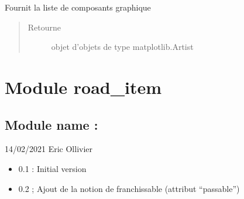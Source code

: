 \documentclass[a4paper,10pt,french]{sphinxmanual}
\begin{document}
\begin{fulllineitems}

\begin{fulllineitems}
\label{\detokenize{road_objects/graphical_item:road_objects.graphical_item.GraphicalItem.get_components}}
Fournit la liste de composants graphique
\begin{quote}\begin{description}
\item[{Retourne}] \leavevmode
objet  d’objets de type matplotlib.Artist

\end{description}\end{quote}

\end{fulllineitems}


\end{fulllineitems}



\section{Module road\_item}
\label{\detokenize{road_objects/road_item::doc}}\label{\detokenize{road_objects/road_item:module-road_objects.road_item}}\label{\detokenize{road_objects/road_item:module-road-item}}

\subsection{Module name : }
\label{\detokenize{road_objects/road_item:module-name-road-item-py}}
 14/02/2021  Eric Ollivier

\begin{itemize}
\item {} 
0.1 : Initial version

\item {} 
0.2 ; Ajout de la notion de franchissable (attribut “passable”)

\end{itemize}
\end{document}
